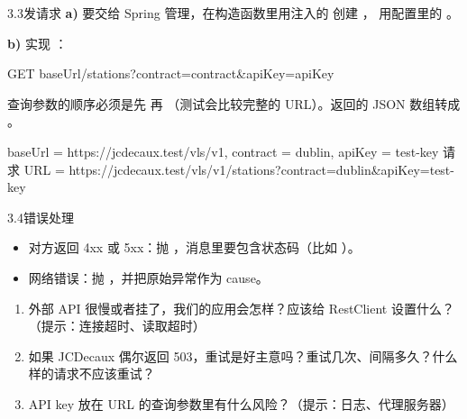 \begin{task}{3.3\quad 发请求}
\textbf{a)}  要交给 Spring 管理，在构造函数里用注入的  创建 ， 用配置里的 。

\textbf{b)} 实现 ：

\begin{plaincode}
GET {baseUrl}/stations?contract={contract}&apiKey={apiKey}
\end{plaincode}

查询参数的顺序必须是先  再 （测试会比较完整的 URL）。返回的 JSON 数组转成 。

\begin{example}
\begin{plaincode}
baseUrl  = https://jcdecaux.test/vls/v1,  contract = dublin,  apiKey = test-key
请求 URL = https://jcdecaux.test/vls/v1/stations?contract=dublin&apiKey=test-key
\end{plaincode}
\end{example}
\end{task}

\begin{task}{3.4\quad 错误处理}
\begin{itemize}
  \item 对方返回 4xx 或 5xx：抛 ，消息里要包含状态码（比如 ）。
  \item 网络错误：抛 ，并把原始异常作为 cause。
\end{itemize}
\end{task}

\begin{think}
\begin{enumerate}
  \item 外部 API 很慢或者挂了，我们的应用会怎样？应该给 RestClient 设置什么？（提示：连接超时、读取超时）
  \item 如果 JCDecaux 偶尔返回 503，重试是好主意吗？重试几次、间隔多久？什么样的请求不应该重试？
  \item API key 放在 URL 的查询参数里有什么风险？（提示：日志、代理服务器）
\end{enumerate}
\end{think}
